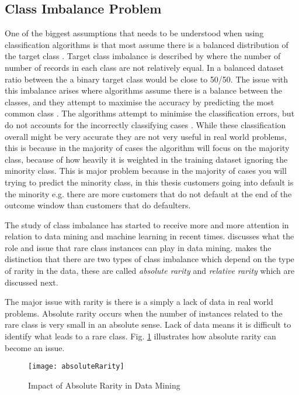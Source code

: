 \subsection{Class Imbalance Problem}
One of the biggest assumptions that needs to be understood when using classification algorithms is that most assume there is a balanced distribution of the target class \citep{japkowicz_class_2000}. Target class imbalance is described by  \citep{chawla_smote:_2002} where the number of number of records in each class are not relatively equal. In a balanced dataset ratio between the a binary target class would be close to 50/50. The issue with this imbalance arises where algorithms assume there is a balance between the classes, and they attempt to maximise the accuracy by predicting the most common class \citep{drummond_severe_2005}. The algorithms attempt to minimise the classification errors, but do not accounts for the incorrectly classifying cases \citep{seiffert_improving_2009}. While these classification overall might be very accurate they are not very useful in real world problems, this is because in the majority of cases the algorithm will focus on the majority class, because of how heavily it is weighted in the training dataset ignoring the minority class. This is major problem because in the majority of cases you will trying to predict the minority class, in this thesis customers going into default is the minority e.g. there are more customers that do not default at the end of the outcome window than customers that do defaulters.

The study of class imbalance has started to receive more and more attention in relation to data mining and machine learning in recent times. \cite{weiss_mining_2004} discusses what the role and issue that rare class instances can play in data mining. \cite{weiss_mining_2004} makes the distinction that there are two types of class imbalance which depend on the type of rarity in the data, these are called \textit{absolute rarity} and \textit{relative rarity} which are discussed next.

The major issue with rarity is there is a simply a lack of data in real world problems. Absolute rarity occurs when the number of instances related to the rare class is very small in an absolute sense. Lack of data means it is difficult to identify what leads to a rare class. Fig. \ref{fig:absoluteRarity} illustrates how absolute rarity can become an issue.

\begin{figure}[H]
	\texttt{[image: absoluteRarity]}
	\caption{
		Impact of Absolute Rarity in Data Mining \\ \cite[Source:][]{weiss_mining_2004}
	}
	\label{fig:absoluteRarity}
\end{figure}

